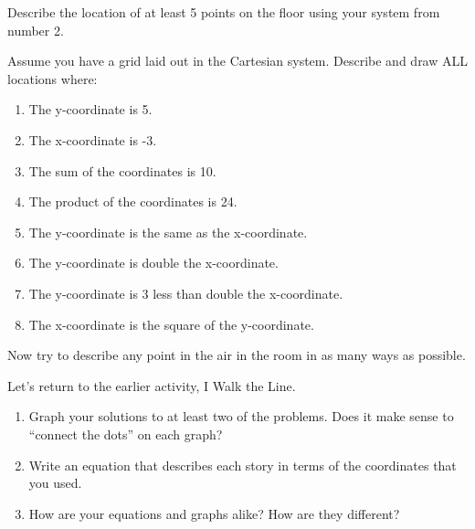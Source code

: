 \documentclass{ximera}
\begin{document}
\begin{problem}
Describe the location of at least 5 points on the floor using your system from number 2.
\end{problem}


\begin{problem}
Assume you have a grid laid out in the Cartesian system.  Describe and draw ALL locations where:
\begin{enumerate}
\item The y-coordinate is 5.
\item The x-coordinate is -3.
\item The sum of the coordinates is 10.
\item The product of the coordinates is 24.
\item The y-coordinate is the same as the x-coordinate.
\item The y-coordinate is double the x-coordinate.
\item The y-coordinate is 3 less than double the x-coordinate.
\item The x-coordinate is the square of the y-coordinate.
\end{enumerate}

\end{problem}

\begin{problem}
Now try to describe any point in the air in the room in as many ways as possible.
\end{problem}

\begin{problem}
Let's return to the earlier activity, I Walk the Line.
    \begin{enumerate}
        \item Graph your solutions to at least two of the problems.  Does it make sense to ``connect the dots'' on each graph?
        \item Write an equation that describes each story in terms of the coordinates that you used.
        \item How are your equations and graphs alike? How are they different?
    \end{enumerate}    

\end{problem}
\end{document}
